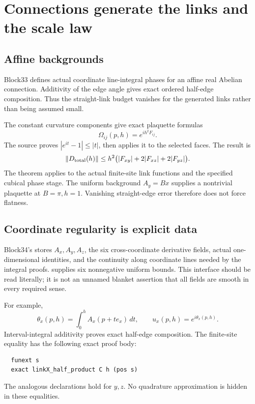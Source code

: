 \section{Connections generate the links and the scale law}

\subsection{Affine backgrounds}

Block33 defines actual coordinate line-integral phases for an affine real Abelian connection. Additivity of the edge angle gives exact ordered half-edge composition. Thus the straight-link budget vanishes for the generated links rather than being assumed small.

The constant curvature components give exact plaquette formulas
\[
 \Omega_{ij}(p,h)=e^{ih^2F_{ij}}.
\]
The source proves \(|e^{it}-1|\le|t|\), then applies it to the selected faces. The result is
\[
 \left\lVert D_{\mathrm{total}}(h)\right\rVert
 \le h^2\bigl(|F_{xy}|+2|F_{xz}|+2|F_{yz}|\bigr).
\]
The theorem  applies to the actual finite-site link functions and the specified cubical phase stage. The uniform background \(A_y=Bx\) supplies a nontrivial plaquette at \(B=\pi,h=1\). Vanishing straight-edge error therefore does not force flatness.

\subsection{Coordinate regularity is explicit data}

Block34's  stores \(A_x,A_y,A_z\), the six cross-coordinate derivative fields, actual one-dimensional  identities, and the continuity along coordinate lines needed by the integral proofs.  supplies six nonnegative uniform bounds. This interface should be read literally; it is not an unnamed blanket assertion that all fields are smooth in every required sense.

For example,
\[
 \theta_x(p,h)=\int_0^h A_x(p+te_x)\,dt,
 \qquad u_x(p,h)=e^{i\theta_x(p,h)}.
\]
Interval-integral additivity proves exact half-edge composition. The finite-site equality  has the following exact proof body:
\begin{lstlisting}
  funext s
  exact linkX_half_product C h (pos s)
\end{lstlisting}
The analogous declarations hold for \(y,z\). No quadrature approximation is hidden in these equalities.

